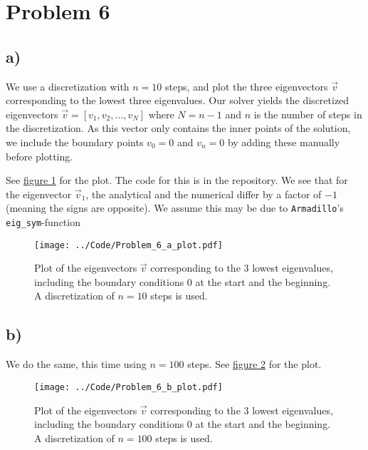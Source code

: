 \documentclass[english,notitlepage]{article}  %
\begin{document}
\section*{Problem 6}
\subsection*{a)}
We use a discretization with $n=10$ steps, and plot the three eigenvectors $\vec{v}$ corresponding to the lowest three eigenvalues. Our solver yields the discretized eigenvectors $\vec{v} = [ v_1, v_2, ..., v_{N} ]$ where $N=n-1$ and $n$ is the number of steps in the discretization. As this vector only contains the inner points of the solution, we include the boundary points $v_0 = 0$ and $v_n = 0$ by adding these manually before plotting.

See \hyperref[fig:6aplot]{figure \ref*{fig:6aplot}} for the plot. The code for this is in the repository. We see that for the eigenvector $\vec{v}_1$, the analytical and the numerical differ by a factor of $-1$ (meaning the signs are opposite). We assume this may be due to \lstinline{Armadillo}'s \lstinline{eig_sym}-function

\begin{figure}[H]
    \centering
    \texttt{[image: ../Code/Problem\_6\_a\_plot.pdf]}
    \caption{Plot of the eigenvectors $\vec{v}$ corresponding to the 3 lowest eigenvalues, including the boundary conditions 0 at the start and the beginning. A discretization of $n=10$ steps is used.}
    \label{fig:6aplot}
\end{figure}

\subsection*{b)}

We do the same, this time using $n=100$ steps. See \hyperref[fig:6bplot]{figure \ref*{fig:6bplot}} for the plot.

\begin{figure}[H]
    \centering
    \texttt{[image: ../Code/Problem\_6\_b\_plot.pdf]}
    \caption{Plot of the eigenvectors $\vec{v}$ corresponding to the 3 lowest eigenvalues, including the boundary conditions 0 at the start and the beginning. A discretization of $n=100$ steps is used.}
    \label{fig:6bplot}
\end{figure}
\end{document}
